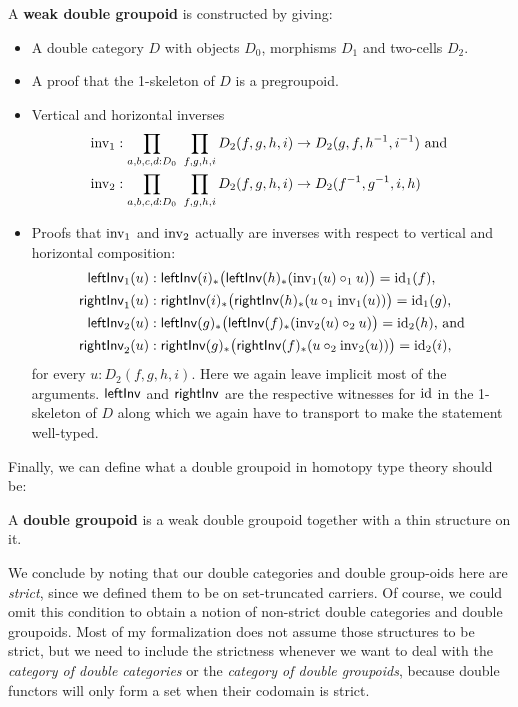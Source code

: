 \begin{defn}
A \textbf{weak double groupoid} is constructed by giving:
\begin{itemize}
\item A double category $D$ with objects $D_0$, morphisms $D_1$ and two-cells $D_2$.
\item A proof that the 1-skeleton of $D$ is a pregroupoid.
\item Vertical and horizontal inverses
\begin{align*}
\operatorname{inv_1} &: \prod_{a,b,c,d:D_0} ~ \prod_{f,g,h,i}
	D_2(f,g,h,i) \to D_2(g,f,h^{-1},i^{-1}) \text{ and } \\
\operatorname{inv_2} &: \prod_{a,b,c,d:D_0} ~ \prod_{f,g,h,i}
	D_2(f,g,h,i) \to D_2(f^{-1},g^{-1},i,h)
\end{align*}
\item Proofs that $\operatorname{inv_1}$ and $\operatorname{inv_2}$ actually are inverses with respect to
vertical and horizontal composition:
\begin{align*}
\mathsf{leftInv}_1(u) &: \mathsf{leftInv}(i)_*\big(\mathsf{leftInv}(h)_*(\operatorname{inv_1}(u) \circ_1 u)\big) =
	\operatorname{id}_1(f) \text{,} \\
\mathsf{rightInv}_1(u) &: \mathsf{rightInv}(i)_*\big(\mathsf{rightInv}(h)_*(u \circ_1 \operatorname{inv_1}(u)) \big) =
	\operatorname{id}_1(g) \text{,} \\
\mathsf{leftInv}_2(u) &: \mathsf{leftInv}(g)_*\big(\mathsf{leftInv}(f)_*(\operatorname{inv_2}(u) \circ_2 u)\big) =
	\operatorname{id}_2(h) \text{, and} \\
\mathsf{rightInv}_2(u) &: \mathsf{rightInv}(g)_*\big(\mathsf{rightInv}(f)_*(u \circ_2 \operatorname{inv_2}(u)) \big) =
	\operatorname{id}_2(i) \text{,}
\end{align*}
for every $u : D_2(f,g,h,i)$.
Here we again leave implicit most of the arguments.
$\mathsf{leftInv}$ and $\mathsf{rightInv}$ are the respective witnesses for $\operatorname{id}$ in the 1-skeleton
of $D$ along which we again have to transport to make the statement well-typed.
\end{itemize}
\end{defn}

Finally, we can define what a double groupoid in homotopy type theory should be:

\begin{defn} \label{def:dbl-gpd-hott}
A \textbf{double groupoid} is a weak double groupoid together with a thin
structure on it.
\end{defn}

We conclude by noting that our double categories and double group-oids here are
\emph{strict}, since we defined them to be on set-truncated carriers.
Of course, we could omit this condition to obtain a notion of non-strict double
categories and double groupoids.
Most of my formalization does not assume those structures to be strict, but we
need to include the strictness whenever we want to deal with the \emph{category
of double categories} or the \emph{category of double groupoids}, because double
functors will only form a set when their codomain is strict.

